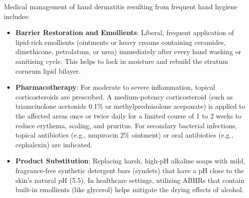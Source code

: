 Medical management of hand dermatitis resulting from frequent hand hygiene includes:
\begin{itemize}
    \item \textbf{Barrier Restoration and Emollients}: Liberal, frequent application of lipid-rich emollients (ointments or heavy creams containing ceramides, dimethicone, petrolatum, or urea) immediately after every hand washing or sanitising cycle. This helps to lock in moisture and rebuild the stratum corneum lipid bilayer.
    \item \textbf{Pharmacotherapy}: For moderate to severe inflammation, topical corticosteroids are prescribed. A medium-potency corticosteroid (such as triamcinolone acetonide 0.1\% or methylprednisolone aceponate) is applied to the affected areas once or twice daily for a limited course of 1 to 2 weeks to reduce erythema, scaling, and pruritus. For secondary bacterial infections, topical antibiotics (e.g., mupirocin 2\% ointment) or oral antibiotics (e.g., cephalexin) are indicated.
    \item \textbf{Product Substitution}: Replacing harsh, high-pH alkaline soaps with mild, fragrance-free synthetic detergent bars (syndets) that have a pH close to the skin's natural pH (5.5). In healthcare settings, utilizing ABHRs that contain built-in emollients (like glycerol) helps mitigate the drying effects of alcohol.
\end{itemize}

